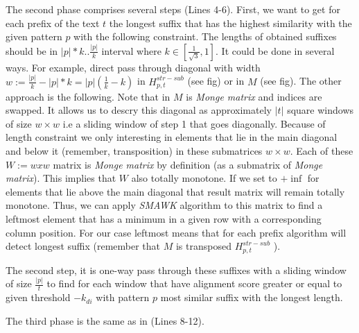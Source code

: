 The second phase comprises several steps (Lines 4-6).
First, we want to get for each prefix of the text $t$ the longest suffix that has the highest similarity with the given pattern $p$ with the following constraint.
The lengths of obtained suffixes should be in $|p|*k..\frac{|p|}{k}$ interval where $k \in [\frac{1}{\sqrt{3}},1]$.
It could be done in several ways.
For example, direct pass through diagonal with width $w:= \frac{|p|}{k} - |p|*k = |p|(\frac{1}{k} - k)$ in $H^{str-sub}_{p,t}$ (see fig) or in $M$ (see fig).
The other approach is the following.
Note that in  $M$ is \emph{Monge matrix} and indices are swapped.
It allows us to descry this diagonal as approximately $|t|$ square windows of size $w \times w$ i.e a sliding window of step 1 that goes diagonally.
Because of length constraint we only interesting in elements that lie in the main diagonal and below it (remember, transposition) in these submatrices $w\times w$.
Each of these $W:=wxw$ matrix is \emph{Monge matrix} by definition (as a submatrix of \emph{Monge matrix}).
This implies that $W$ also totally monotone.
If we set to $+\inf$ for elements that lie above the main diagonal that result matrix will remain totally monotone.
Thus, we can apply \emph{SMAWK} algorithm to this matrix to find a leftmost element that has a minimum in a given row with a corresponding column position.
For our case leftmost means that for each prefix algorithm will detect longest suffix (remember that $M$ is transposed $H^{str-sub}_{p,t}$ ).

The second step, it is one-way pass through these suffixes with a sliding window of size $\frac{|p|}{t}$ to find for each window that have alignment score greater or equal to given threshold $-k_{di}$ with pattern $p$ most similar suffix with the longest length. 

The third phase is the same as in \cite{luciv2019interactive} (Lines 8-12).  



